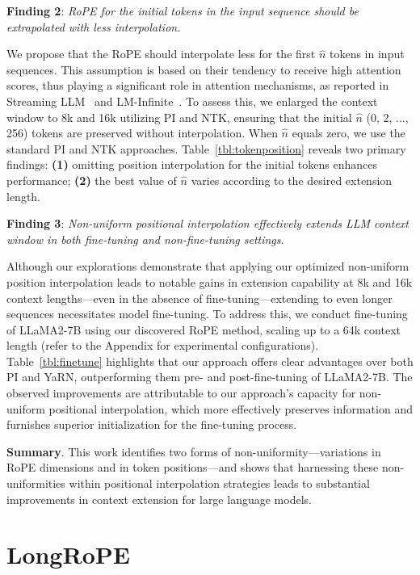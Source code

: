 \textbf{Finding 2}: \textit{RoPE for the initial tokens in the input sequence should be extrapolated with less interpolation.} 

We propose that the RoPE should interpolate less for the first $\hat{n}$ tokens in input sequences. This assumption is based on their tendency to receive high attention scores, thus playing a significant role in attention mechanisms, as reported in Streaming LLM~\cite{streamingllm} and LM-Infinite~\cite{han2023lminfinite}. To assess this, we enlarged the context window to 8k and 16k utilizing PI and NTK, ensuring that the initial $\hat n$ (0, 2, ..., 256) tokens are preserved without interpolation. When $\hat n$ equals zero, we use the standard PI and NTK approaches. Table~\ref{tbl:tokenposition} reveals two primary findings: \textbf{(1)} omitting position interpolation for the initial tokens enhances performance; \textbf{(2)} the best value of $\hat n$ varies according to the desired extension length.

\textbf{Finding 3}: \textit{Non-uniform positional interpolation effectively extends LLM context window in both fine-tuning and non-fine-tuning settings.} 

Although our explorations demonstrate that applying our optimized non-uniform position interpolation leads to notable gains in extension capability at 8k and 16k context lengths—even in the absence of fine-tuning—extending to even longer sequences necessitates model fine-tuning. To address this, we conduct fine-tuning of LLaMA2-7B using our discovered RoPE method, scaling up to a 64k context length (refer to the Appendix for experimental configurations). Table~\ref{tbl:finetune} highlights that our approach offers clear advantages over both PI and YaRN, outperforming them pre- and post-fine-tuning of LLaMA2-7B. The observed improvements are attributable to our approach's capacity for non-uniform positional interpolation, which more effectively preserves information and furnishes superior initialization for the fine-tuning process.

\textbf{Summary}. This work identifies two forms of non-uniformity—variations in RoPE dimensions and in token positions—and shows that harnessing these non-uniformities within positional interpolation strategies leads to substantial improvements in context extension for large language models.

\section{LongRoPE}

